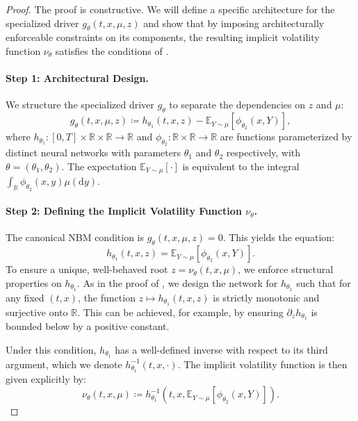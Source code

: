 \documentclass[qian]{imsart}
\newcommand{\R}{\mathbb{R}}
\newcommand{\dd}{\mathrm{d}}
\theoremstyle{plain}
\theoremstyle{definition}
\begin{document}
\begin{proof}
The proof is constructive. We will define a specific architecture for the specialized driver $g_\theta(t,x,\mu,z)$ and show that by imposing architecturally enforceable constraints on its components, the resulting implicit volatility function $\nu_\theta$ satisfies the conditions of .

\paragraph{Step 1: Architectural Design.}
We structure the specialized driver $g_\theta$ to separate the dependencies on $z$ and $\mu$:
\begin{equation}
\label{eq:mckean_driver_arch}
    g_\theta(t, x, \mu, z) \coloneqq h_{\theta_1}(t, x, z) - \mathbb{E}_{Y \sim \mu}[\phi_{\theta_2}(x, Y)],
\end{equation}
where $h_{\theta_1}: [0,T] \times \R \times \R \to \R$ and $\phi_{\theta_2}: \R \times \R \to \R$ are functions parameterized by distinct neural networks with parameters $\theta_1$ and $\theta_2$ respectively, with $\theta = (\theta_1, \theta_2)$. The expectation $\mathbb{E}_{Y \sim \mu}[\cdot]$ is equivalent to the integral $\int_\R \phi_{\theta_2}(x, y)\mu(\dd y)$.

\paragraph{Step 2: Defining the Implicit Volatility Function $\nu_\theta$.}
The canonical NBM condition is $g_\theta(t, x, \mu, z) = 0$. This yields the equation:
\[ h_{\theta_1}(t, x, z) = \mathbb{E}_{Y \sim \mu}[\phi_{\theta_2}(x, Y)]. \]
To ensure a unique, well-behaved root $z = \nu_\theta(t,x,\mu)$, we enforce structural properties on $h_{\theta_1}$. As in the proof of , we design the network for $h_{\theta_1}$ such that for any fixed $(t,x)$, the function $z \mapsto h_{\theta_1}(t,x,z)$ is strictly monotonic and surjective onto $\R$. This can be achieved, for example, by ensuring $\partial_z h_{\theta_1}$ is bounded below by a positive constant.

Under this condition, $h_{\theta_1}$ has a well-defined inverse with respect to its third argument, which we denote $h_{\theta_1}^{-1}(t,x,\cdot)$. The implicit volatility function is then given explicitly by:
\begin{equation}
\label{eq:nu_theta_explicit}
    \nu_\theta(t, x, \mu) \coloneqq h_{\theta_1}^{-1}\left(t, x, \mathbb{E}_{Y \sim \mu}[\phi_{\theta_2}(x, Y)]\right).
\end{equation}


\end{proof}
\end{document}
